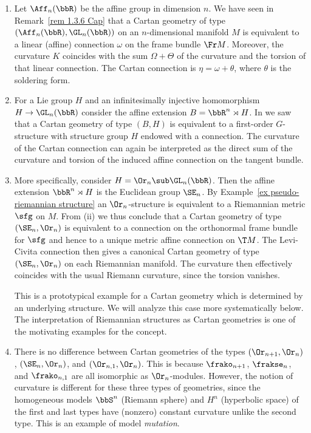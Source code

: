 \begin{example}\label{ex 1.5.1 Cap}
    \begin{enumerate}[label=(\roman*)]
        \item Let $\Aff_n(\bbR)$ be the affine group in dimension $n$. We have seen in Remark~\ref{rem 1.3.6 Cap} that a Cartan geometry of type $(\Aff_n(\bbR),\GL_n(\bbR))$ on an $n$-dimensional manifold $M$ is equivalent to a linear (affine) connection $\omega$ on the frame bundle $\Fr M$. Moreover, the curvature $K$ coincides with the sum $\Omega+\Theta$ of the curvature and the torsion of that linear connection. The Cartan connection is $\eta=\omega+\theta$, where $\theta$ is the soldering form.
        \item For a Lie group $H$ and an infinitesimally injective homomorphism $H\to \GL_n(\bbR)$ consider the affine extension $B=\bbR^n\rtimes H$. In  we saw that a Cartan geometry of type $(B,H)$ is equivalent to a first-order $G$-structure with structure group $H$ endowed with a connection. The curvature of the Cartan connection can again be interpreted as the direct sum of the curvature and torsion of the induced affine connection on the tangent bundle.
        \item More specifically, consider $H=\Or_n\sub \GL_n(\bbR)$. Then the affine extension $\bbR^n\rtimes H$ is the Euclidean group $\SE_n$. By Example~\ref{ex pseudo-riemannian structure} an $\Or_n$-structure is equivalent to a Riemannian metric $\sfg$ on $M$. From (ii) we thus conclude that a Cartan geometry of type $(\SE_n,\Or_n)$ is equivalent to a connection on the orthonormal frame bundle for $\sfg$ and hence to a unique metric affine connection on $\T M$. The Levi-Civita connection then gives a canonical Cartan geometry of type $(\SE_n,\Or_n)$ on each Riemannian manifold. The curvature then effectively coincides with the usual Riemann curvature, since the torsion vanishes.
        
        This is a prototypical example for a Cartan geometry which is determined by an underlying structure. We will analyze this case more systematically below. The interpretation of Riemannian structures as Cartan geometries is one of the motivating examples for the concept. 
        \item There is no difference between Cartan geometries of the types $(\Or_{n+1},\Or_n)$, $(\SE_n,\Or_n)$, and $(\Or_{n,1},\Or_n)$. This is because $\frako_{n+1}$, $\frakse_{n}$, and $\frako_{n,1}$ are all isomorphic as $\Or_n$-modules. However, the notion of curvature is different for these three types of geometries, since the homogeneous models $\bbS^n$ (Riemann sphere) and $H^n$ (hyperbolic space) of the first and last types have (nonzero) constant curvature unlike the second type. This is an example of model \emph{mutation}.
    \end{enumerate}
\end{example}

